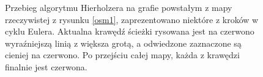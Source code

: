 \documentclass[a4paper, 12pt, twoside, openright]{article}
\begin{document}
\captionsetup{justification=centering}
\begin{figure}[!p]
	\centering
	\quad
	
	\caption[]{Przebieg algorytmu Hierholzera na grafie powstałym z mapy rzeczywistej z rysunku \ref{osm1}, zaprezentowano niektóre z kroków w cyklu Eulera. Aktualna krawędź ścieżki rysowana jest na czerwono wyraźniejszą linią z większa grotą, a odwiedzone zaznaczone są cieniej na czerwono. Po przejściu całej mapy, każda z krawędzi finalnie jest czerwona.}
	\label{g_rzecz1}
\end{figure}	
\end{document}

